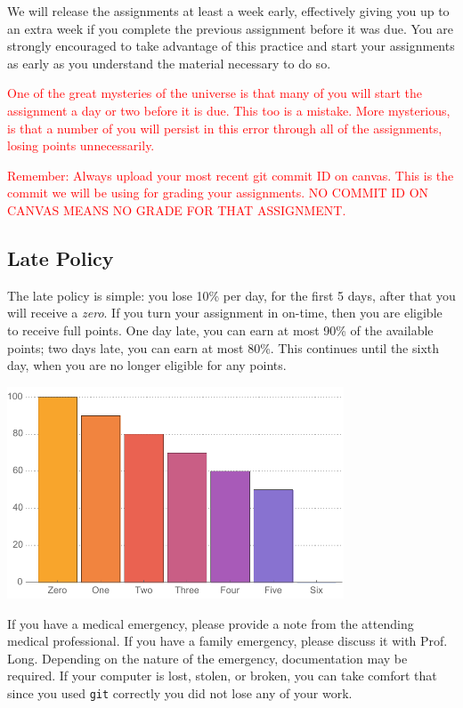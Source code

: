 \documentclass{article}
\begin{document}
We will release the assignments at least a week
early, effectively giving you up to an extra week if you complete
the previous assignment before it was due.
You are strongly encouraged to take advantage of this practice and start your
assignments as early as you understand the material necessary to do so.

\textcolor{red}{One of the great mysteries of the universe is that many of you will start the
assignment a day or two before it is due. This too is a mistake. More mysterious, is that a number
of you will persist in this error through all of the assignments, losing points unnecessarily.}


\textcolor{red}{Remember: Always upload your most recent git commit ID on canvas. This is the commit we will be using for grading your assignments. NO COMMIT ID ON CANVAS MEANS NO GRADE FOR THAT ASSIGNMENT.}

\subsection{Late Policy}
The late policy is simple: you lose
10\% per day, for the first 5 days, after that you
will receive a \emph{zero}.
If you turn your assignment in on-time, then you are eligible to receive full
points. One day late, you can earn at most 90\% of the available points;
two days late, you can earn at most 80\%. This continues until the sixth day,
when you are no longer eligible for any points.


\centerline{\includegraphics[width=0.75\textwidth]{Tardiness.pdf}}

If you have a medical emergency, please provide a note from the
attending medical professional. If you have a family emergency,
please discuss it with Prof.\xspace Long. Depending on the nature
of the emergency, documentation may be required. If your computer is lost,
stolen, or broken, you can take comfort that since you used \texttt{git}
correctly you did not lose any of your work.
\end{document}
